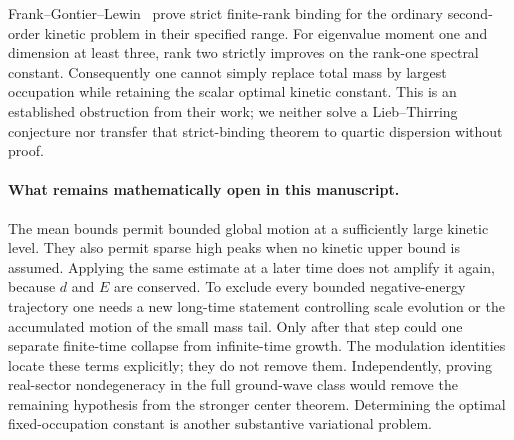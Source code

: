 \documentclass[11pt,a4paper]{article}
\theoremstyle{remark}\newtheorem{remark}[theorem]{Remark}
\begin{document}
Frank--Gontier--Lewin~\cite{FGL} prove strict finite-rank binding for
the ordinary second-order kinetic problem in their specified range.
For eigenvalue moment one and dimension at least three, rank two
strictly improves on the rank-one spectral constant. Consequently
one cannot simply replace total mass by largest occupation while
retaining the scalar optimal kinetic constant. This is an established
obstruction from their work; we neither solve a Lieb--Thirring
conjecture nor transfer that strict-binding theorem to quartic
dispersion without proof.

\paragraph{What remains mathematically open in this manuscript.}
The mean bounds permit bounded global motion at a sufficiently large
kinetic level. They also permit sparse high peaks when no kinetic
upper bound is assumed. Applying the same estimate at a later time
does not amplify it again, because $d$ and $E$ are conserved.
To exclude every bounded negative-energy trajectory one needs a new
long-time statement controlling scale evolution or the accumulated
motion of the small mass tail. Only after that step could one
separate finite-time collapse from infinite-time growth. The
modulation identities locate these terms explicitly; they do not
remove them. Independently, proving real-sector nondegeneracy in
the full ground-wave class would remove the remaining hypothesis
from the stronger center theorem. Determining the optimal
fixed-occupation constant is another substantive variational problem.

\appendix



\end{document}
